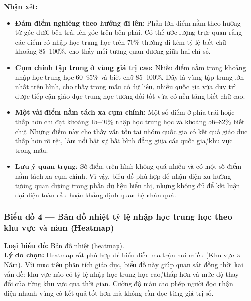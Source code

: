 \textbf{Nhận xét:}
\begin{itemize}
    \item \textbf{Đám điểm nghiêng theo hướng đi lên:} Phần lớn điểm nằm theo hướng từ góc dưới bên trái lên góc trên bên phải. Có thể ước lượng trực quan rằng các điểm có nhập học trung học trên 70\% thường đi kèm tỷ lệ biết chữ khoảng 85--100\%, cho thấy mối tương quan dương giữa hai chỉ số.
    \item \textbf{Cụm chính tập trung ở vùng giá trị cao:} Nhiều điểm nằm trong khoảng nhập học trung học 60--95\% và biết chữ 85--100\%. Đây là vùng tập trung lớn nhất trên hình, cho thấy trong mẫu có dữ liệu, nhiều quốc gia vừa duy trì được tiếp cận giáo dục trung học tương đối tốt vừa có nền tảng biết chữ cao.
    \item \textbf{Một vài điểm nằm tách xa cụm chính:} Một số điểm ở phía trái hoặc thấp hơn chỉ đạt khoảng 15--40\% nhập học trung học và khoảng 56--82\% biết chữ. Những điểm này cho thấy vẫn tồn tại nhóm quốc gia có kết quả giáo dục thấp hơn rõ rệt, làm nổi bật sự bất bình đẳng giữa các quốc gia/khu vực trong mẫu.
    \item \textbf{Lưu ý quan trọng:} Số điểm trên hình không quá nhiều và có một số điểm nằm tách xa cụm chính. Vì vậy, biểu đồ phù hợp để nhận diện xu hướng tương quan dương trong phần dữ liệu hiển thị, nhưng không đủ để kết luận đại diện toàn cầu hoặc khẳng định quan hệ nhân quả.
\end{itemize}

\subsubsection{Biểu đồ 4 --- Bản đồ nhiệt tỷ lệ nhập học trung học theo khu vực và năm (Heatmap)}

\textbf{Loại biểu đồ:} Bản đồ nhiệt (heatmap).\\
\textbf{Lý do chọn:} Heatmap rất phù hợp để biểu diễn ma trận hai chiều (Khu vực $\times$ Năm). Với mục tiêu phân tích giáo dục, biểu đồ này giúp quan sát đồng thời hai vấn đề: khu vực nào có tỷ lệ nhập học trung học cao/thấp hơn và mức độ thay đổi của từng khu vực qua thời gian. Cường độ màu cho phép người đọc nhận diện nhanh vùng có kết quả tốt hơn mà không cần đọc từng giá trị số.



